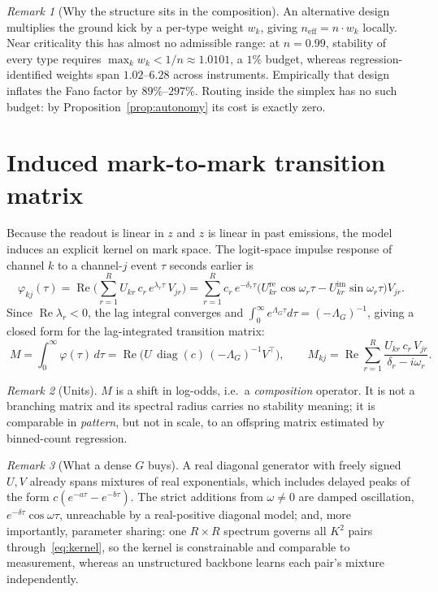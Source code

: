 \documentclass[11pt]{article}
\theoremstyle{remark}
\newtheorem{remark}{Remark}
\newcommand{\Real}{\operatorname{Re}}
\newcommand{\diag}{\operatorname{diag}}
\begin{document}
\begin{remark}[Why the structure sits in the composition]
An alternative design multiplies the ground kick by a per-type weight $w_k$,
giving $n_{\mathrm{eff}}=n\cdot w_k$ locally. Near criticality this has almost no
admissible range: at $n=0.99$, stability of every type requires
$\max_k w_k<1/n\approx1.0101$, a $1\%$ budget, whereas regression-identified
weights span $1.02$--$6.28$ across instruments. Empirically that design inflates
the Fano factor by $89\%$--$297\%$. Routing inside the simplex has no such
budget: by Proposition~\ref{prop:autonomy} its cost is exactly zero.
\end{remark}

\section{Induced mark-to-mark transition matrix}

Because the readout is linear in $z$ and $z$ is linear in past emissions, the
model induces an explicit kernel on mark space. The logit-space impulse response
of channel $k$ to a channel-$j$ event $\tau$ seconds earlier is
\begin{equation}
\varphi_{kj}(\tau)
=\Real\!\Big(\sum_{r=1}^{R}U_{kr}\,c_r\,e^{\lambda_r\tau}\,V_{jr}\Big)
=\sum_{r=1}^{R}c_r\,e^{-\delta_r\tau}
\Big(U^{\mathrm{re}}_{kr}\cos\omega_r\tau-U^{\mathrm{im}}_{kr}\sin\omega_r\tau\Big)V_{jr}.
\label{eq:kernel}
\end{equation}
Since $\Real\lambda_r<0$, the lag integral converges and
$\int_0^\infty e^{\Lambda_G\tau}d\tau=(-\Lambda_G)^{-1}$, giving a closed form
for the lag-integrated transition matrix:
\begin{equation}
\boxed{\;
M=\int_0^\infty\varphi(\tau)\,d\tau
=\Real\!\Big(U\,\diag(c)\,(-\Lambda_G)^{-1}V^{\!\top}\Big),
\qquad
M_{kj}=\Real\sum_{r=1}^{R}\frac{U_{kr}\,c_r\,V_{jr}}{\delta_r-i\omega_r}.\;}
\label{eq:M}
\end{equation}

\begin{remark}[Units]
$M$ is a shift in log-odds, i.e.\ a \emph{composition} operator. It is not a
branching matrix and its spectral radius carries no stability meaning; it is
comparable in \emph{pattern}, but not in scale, to an offspring matrix estimated
by binned-count regression.
\end{remark}

\begin{remark}[What a dense $G$ buys]
A real diagonal generator with freely signed $U,V$ already spans mixtures of
real exponentials, which includes delayed peaks of the form
$c(e^{-a\tau}-e^{-b\tau})$. The strict additions from $\omega\neq0$ are damped
oscillation, $e^{-\delta\tau}\cos\omega\tau$, unreachable by a real-positive
diagonal model; and, more importantly, parameter sharing: one $R\times R$
spectrum governs all $K^2$ pairs through~\eqref{eq:kernel}, so the kernel is
constrainable and comparable to measurement, whereas an unstructured backbone
learns each pair's mixture independently.
\end{remark}
\end{document}
